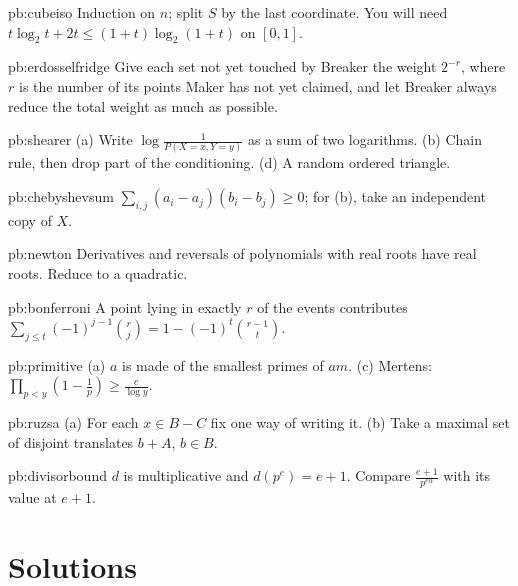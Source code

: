 \begin{hint}{pb:cubeiso}
Induction on $n$; split $S$ by the last coordinate. You will need $t\log_2t+2t\le(1+t)\log_2(1+t)$ on $[0,1]$.
\end{hint}

\begin{hint}{pb:erdosselfridge}
Give each set not yet touched by Breaker the weight $2^{-r}$, where $r$ is the number of its points Maker has not yet claimed, and let Breaker always reduce the
total weight as much as possible.
\end{hint}

\begin{hint}{pb:shearer}
(a) Write $\log\frac1{P(X=x,Y=y)}$ as a sum of two logarithms. (b) Chain rule, then drop part of the conditioning. (d) A random ordered triangle.
\end{hint}

\begin{hint}{pb:chebyshevsum}
$\sum_{i,j}(a_i-a_j)(b_i-b_j)\ge0$; for (b), take an independent copy of $X$.
\end{hint}

\begin{hint}{pb:newton}
Derivatives and reversals of polynomials with real roots have real roots. Reduce to a quadratic.
\end{hint}

\begin{hint}{pb:bonferroni}
A point lying in exactly $r$ of the events contributes $\sum_{j\le t}(-1)^{j-1}\binom rj=1-(-1)^t\binom{r-1}t$.
\end{hint}

\begin{hint}{pb:primitive}
(a) $a$ is made of the smallest primes of $am$. (c) Mertens: $\prod_{p<y}(1-\frac1p)\ge\frac c{\log y}$.
\end{hint}

\begin{hint}{pb:ruzsa}
(a) For each $x\in B-C$ fix one way of writing it. (b) Take a maximal set of disjoint translates $b+A$, $b\in B$.
\end{hint}

\begin{hint}{pb:divisorbound}
$d$ is multiplicative and $d(p^e)=e+1$. Compare $\frac{e+1}{p^{e\alpha}}$ with its value at $e+1$.
\end{hint}

\section{Solutions}

